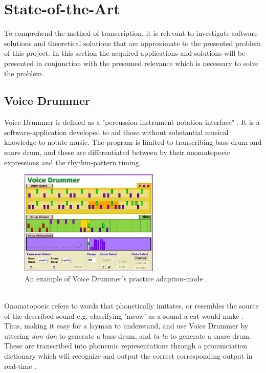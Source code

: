 \section{ State-of-the-Art }
To comprehend the method of transcription, it is relevant to investigate software solutions and theoretical solutions that are approximate to the presented problem of this project. In this section the acquired applications and solutions will be presented in conjunction with the presumed relevance which is necessary to solve the problem.

\subsection{ Voice Drummer }
Voice Drummer is defined as a "percussion instrument notation interface"  \citep{VoiceDrummer}. It is a software-application developed to aid those without substantial musical knowledge to notate music. The program is limited to transcribing bass drum and snare drum, and these are differentiated between by their onomatopoeic expressions and the rhythm-pattern timing.
\\
\begin{figure}[h]
	\begin{center}
		\includegraphics[height=5cm]{fig/VoiceDrummer.png}
		\caption{An example of Voice Drummer's practice adaption-mode \citep{VoiceDrummer}.}
		\label{VoiceDrummer}
	\end{center}
\end{figure}
\\
Onomatopoeic refers to words that phonetically imitates, or resembles the source of the described sound e.g. classifying 'meow' as a sound a cat would make \citep{VoiceDrummer}. Thus, making it easy for a layman to understand, and use Voice Drummer by uttering \textit{don-don} to generate a bass drum, and \textit{ta-ta} to generate a snare drum. These are transcribed into phonemic representations through a pronunciation dictionary which will recognize and output the correct corresponding output in real-time \citep{VoiceDrummer}.

